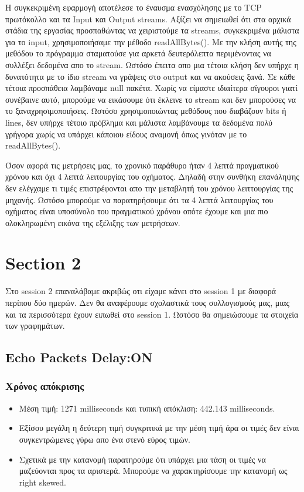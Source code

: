 \documentclass[hidelinks, 12pt, a4paper]{article}
\begin{document}
Η συγκεκριμένη εφαρμογή αποτέλεσε το έναυσμα ενασχόλησης με το TCP πρωτόκολλο και τα Input και Output streams. Αξίζει να σημειωθεί ότι στα αρχικά στάδια της εργασίας προσπαθώντας να χειριστούμε τα streams, συγκεκριμένα μάλιστα για το input, χρησιμοποιήσαμε την μέθοδο readAllBytes(). Με την κλήση αυτής της μεθόδου το πρόγραμμα σταματούσε για αρκετά δευτερόλεπτα περιμένοντας να συλλέξει δεδομένα απο το stream. Ωστόσο έπειτα απο μια τέτοια κλήση δεν υπήρχε η δυνατότητα με το ίδιο stream να γράψεις στο output και να ακούσεις ξανά. Σε κάθε τέτοια προσπάθεια λαμβάναμε null πακέτα. Χωρίς να είμαστε ιδιαίτερα σίγουροι γιατί συνέβαινε αυτό, μπορούμε να εικάσουμε ότι έκλεινε το stream και δεν μπορούσες να το ξαναχρησιμοποιήσεις. Ωστόσο χρησιμοποιώντας μεθόδους που διαβάζουν bits ή lines, δεν υπήρχε τέτοιο πρόβλημα και μάλιστα λαμβάνουμε τα δεδομένα πολύ γρήγορα χωρίς να υπάρχει κάποιου είδους αναμονή όπως γινόταν με το readAllBytes().  

Όσον αφορά τις μετρήσεις μας, το χρονικό παράθυρο ήταν 4 λεπτά πραγματικού χρόνου και όχι 4 λεπτά λειτουργίας του οχήματος. Δηλαδή στην συνθήκη επανάληψης δεν ελέγχαμε τι τιμές επιστρέφονται απο την μεταβλητή του χρόνου λειττουργίας της μηχανής. Ωστόσο μπορούμε να παρατηρήσουμε ότι τα 4 λεπτά λειτουργίας του οχήματος είναι υποσύνολο του πραγματικού χρόνου οπότε έχουμε και μια πιο ολοκληρωμένη εικόνα της εξέλιξης των μετρήσεων. 

\section{Section 2}

Στο session 2 επαναλάβαμε ακριβώς οτι είχαμε κάνει στο session 1 με διαφορά περίπου δύο ημερών. Δεν θα αναφέρουμε σχολαστικά τους συλλογισμούς μας, μιας και τα περισσότερα έχουν ειπωθεί στο session 1. Ωστόσο θα σημειώσουμε τα στοιχεία των γραφημάτων.

\subsection{Echo Packets Delay:ON}
\subsubsection{Χρόνος απόκρισης}
\begin{itemize}
    \item Μέση τιμή: 1271 milliseconds και τυπική απόκλιση: 442.143 milliseconds.
    \item Εξίσου μεγάλη η δεύτερη τιμή συγκριτικά με την μέση τιμή άρα οι τιμές δεν είναι συγκεντρώμενες γύρω απο ένα στενό εύρος τιμών.
    \item Σχετικά με την κατανομή παρατηρούμε ότι υπάρχει μια τάση οι τιμές να μαζεύονται προς τα αριστερά. Μπορούμε να χαρακτηρίσουμε την κατανομή ως right skewed.
\end{itemize}
\end{document}
